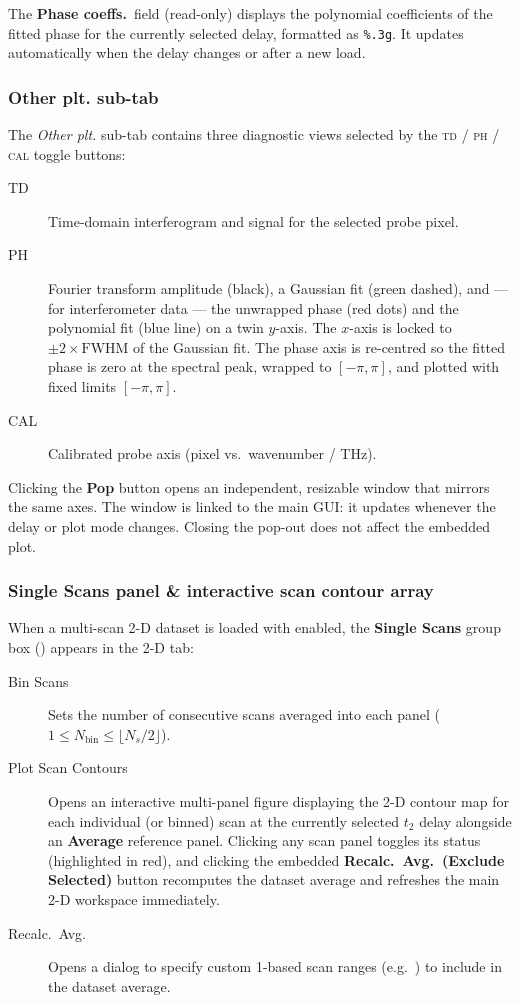 The \textbf{Phase coeffs.}\ field (read-only) displays the polynomial
coefficients of the fitted phase for the currently selected delay,
formatted as \texttt{\%.3g}.  It updates automatically when the delay
changes or after a new load.

\subsubsection{Other plt. sub-tab}

The \emph{Other plt.} sub-tab contains three diagnostic views selected
by the \textsc{td} / \textsc{ph} / \textsc{cal} toggle buttons:

\begin{description}
  \item[TD] Time-domain interferogram and signal for the selected
    probe pixel.
  \item[PH] Fourier transform amplitude (black), a Gaussian fit
    (green dashed), and — for interferometer data — the unwrapped
    phase (red dots) and the polynomial fit (blue line) on a twin
    $y$-axis.  The $x$-axis is locked to $\pm 2\times\mathrm{FWHM}$
    of the Gaussian fit.  The phase axis is re-centred so the fitted
    phase is zero at the spectral peak, wrapped to $[-\pi,\pi]$, and
    plotted with fixed limits $[-\pi,\pi]$.
  \item[CAL] Calibrated probe axis (pixel vs.\ wavenumber / THz).
\end{description}

Clicking the \textbf{Pop} button opens an independent, resizable window
that mirrors the same axes.  The window is linked to the main GUI: it
updates whenever the delay or plot mode changes.  Closing the pop-out
does not affect the embedded plot.

\subsubsection{Single Scans panel \& interactive scan contour array}

When a multi-scan 2-D dataset is loaded with  enabled, the \textbf{Single Scans} group box () appears in the 2-D tab:
\begin{description}
  \item[Bin Scans] Sets the number of consecutive scans averaged into each panel ($1 \le N_{\text{bin}} \le \lfloor N_s / 2 \rfloor$).
  \item[Plot Scan Contours] Opens an interactive multi-panel figure displaying the 2-D contour map for each individual (or binned) scan at the currently selected $t_2$ delay alongside an \textbf{Average} reference panel. Clicking any scan panel toggles its \code{[Excluded]} status (highlighted in red), and clicking the embedded \textbf{Recalc.\ Avg.\ (Exclude Selected)} button recomputes the dataset average and refreshes the main 2-D workspace immediately.
  \item[Recalc.\ Avg.] Opens a dialog to specify custom 1-based scan ranges (e.g.\ ) to include in the dataset average.
\end{description}

